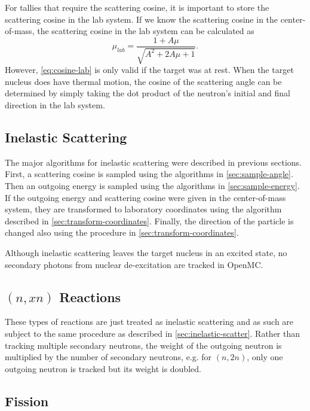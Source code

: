For tallies that require the scattering cosine, it is important to store the
scattering cosine in the lab system. If we know the scattering cosine in the
center-of-mass, the scattering cosine in the lab system can be calculated as
\begin{equation}
  \label{eq:cosine-lab}
  \mu_{lab} = \frac{1 + A\mu}{\sqrt{A^2 + 2A\mu + 1}}.
\end{equation}
However, \eqref{eq:cosine-lab} is only valid if the target was at rest. When the
target nucleus does have thermal motion, the cosine of the scattering angle can
be determined by simply taking the dot product of the neutron's initial and
final direction in the lab system.

\subsection{Inelastic Scattering}
\label{sec:inelastic-scatter}

The major algorithms for inelastic scattering were described in previous
sections. First, a scattering cosine is sampled using the algorithms in
\autoref{sec:sample-angle}. Then an outgoing energy is sampled using the
algorithms in \autoref{sec:sample-energy}. If the outgoing energy and scattering
cosine were given in the center-of-mass system, they are transformed to
laboratory coordinates using the algorithm described in
\autoref{sec:transform-coordinates}. Finally, the direction of the particle is
changed also using the procedure in \autoref{sec:transform-coordinates}.

Although inelastic scattering leaves the target nucleus in an excited state, no
secondary photons from nuclear de-excitation are tracked in OpenMC.

\subsection{$(n,xn)$ Reactions}

These types of reactions are just treated as inelastic scattering and as such
are subject to the same procedure as described in
\autoref{sec:inelastic-scatter}. Rather than tracking multiple secondary
neutrons, the weight of the outgoing neutron is multiplied by the number of
secondary neutrons, e.g. for $(n,2n)$, only one outgoing neutron is tracked but
its weight is doubled.

\subsection{Fission}
\label{sec:fission}

